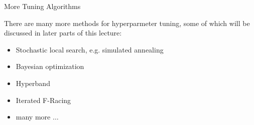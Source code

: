 \begin{frame}{More Tuning Algorithms}

There are many more methods for hyperparmeter tuning, some of which will be discussed in later parts of this lecture:


\begin{itemize}
\item Stochastic local search, e.g. simulated annealing
\item Bayesian optimization
\item Hyperband
\item Iterated F-Racing
\item many more $\dots$
\end{itemize}

\end{frame}


